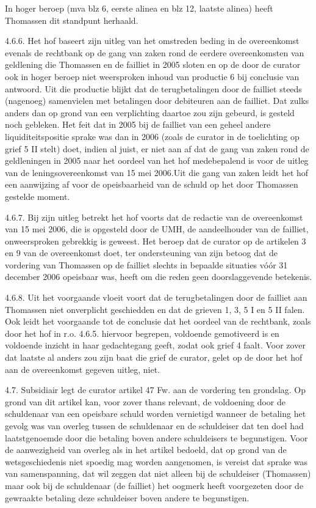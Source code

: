 \documentclass[
  dutch,
  a4paper,
]{article}
\begin{document}
In hoger beroep (mva blz 6, eerste alinea en blz 12, laatste alinea) heeft Thomassen dit standpunt herhaald.

4.6.6. Het hof baseert zijn uitleg van het omstreden beding in de overeenkomst evenals de rechtbank op de gang van zaken rond de eerdere overeenkomsten van geldlening die Thomassen en de failliet in 2005 sloten en op de door de curator ook in hoger beroep niet weersproken inhoud van productie 6 bij conclusie van antwoord. Uit die productie blijkt dat de terugbetalingen door de failliet steeds (nagenoeg) samenvielen met betalingen door debiteuren aan de failliet. Dat zulks anders dan op grond van een verplichting daartoe zou zijn gebeurd, is gesteld noch gebleken. Het feit dat in 2005 bij de failliet van een geheel andere liquiditeitspositie sprake was dan in 2006 (zoals de curator in de toelichting op grief 5 II stelt) doet, indien al juist, er niet aan af dat de gang van zaken rond de geldleningen in 2005 naar het oordeel van het hof medebepalend is voor de uitleg van de leningsovereenkomst van 15 mei 2006.Uit die gang van zaken leidt het hof een aanwijzing af voor de opeisbaarheid van de schuld op het door Thomassen gestelde moment.

4.6.7. Bij zijn uitleg betrekt het hof voorts dat de redactie van de overeenkomst van 15 mei 2006, die is opgesteld door de UMH, de aandeelhouder van de failliet, onweersproken gebrekkig is geweest. Het beroep dat de curator op de artikelen 3 en 9 van de overeenkomst doet, ter ondersteuning van zijn betoog dat de vordering van Thomassen op de failliet slechts in bepaalde situaties vóór 31 december 2006 opeisbaar was, heeft om die reden geen doorslaggevende betekenis.

4.6.8. Uit het voorgaande vloeit voort dat de terugbetalingen door de failliet aan Thomassen niet onverplicht geschiedden en dat de grieven 1, 3, 5 I en 5 II falen. Ook leidt het voorgaande tot de conclusie dat het oordeel van de rechtbank, zoals door het hof in r.o. 4.6.5. hiervoor begrepen, voldoende gemotiveerd is en voldoende inzicht in haar gedachtegang geeft, zodat ook grief 4 faalt. Voor zover dat laatste al anders zou zijn baat die grief de curator, gelet op de door het hof aan de overeenkomst gegeven uitleg, niet.

4.7. Subsidiair legt de curator artikel 47 Fw. aan de vordering ten grondslag. Op grond van dit artikel kan, voor zover thans relevant, de voldoening door de schuldenaar van een opeisbare schuld worden vernietigd wanneer de betaling het gevolg was van overleg tussen de schuldenaar en de schuldeiser dat ten doel had laatstgenoemde door die betaling boven andere schuldeisers te begunstigen. Voor de aanwezigheid van overleg als in het artikel bedoeld, dat op grond van de wetsgeschiedenis niet spoedig mag worden aangenomen, is vereist dat sprake was van samenspanning, dat wil zeggen dat niet alleen bij de schuldeiser (Thomassen) maar ook bij de schuldenaar (de failliet) het oogmerk heeft voorgezeten door de gewraakte betaling deze schuldeiser boven andere te begunstigen.
\end{document}
